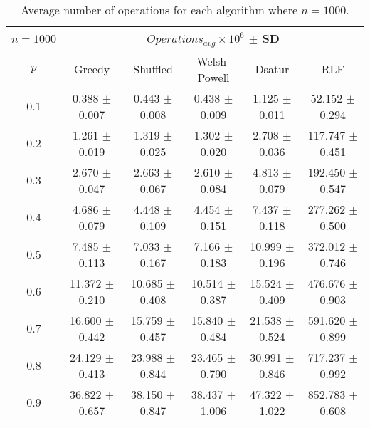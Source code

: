 \begin{table}[H]
    \centering
    \begin{tabular}{cccccc}
        
        $n = 1000$& \multicolumn{5}{c}{$Operations_{avg}\times10^6$ $\pm$ SD} \\
        \hline
        $p$ & Greedy & Shuffled & Welsh-Powell & Dsatur & RLF \\
        \hline
        0.1 & 0.388 $\pm$ 0.007 & 0.443 $\pm$ 0.008 & 0.438 $\pm$ 0.009 & 1.125 $\pm$ 0.011 & 52.152 $\pm$ 0.294 \\
        0.2 & 1.261 $\pm$ 0.019 & 1.319 $\pm$ 0.025 & 1.302 $\pm$ 0.020 & 2.708 $\pm$ 0.036 & 117.747 $\pm$ 0.451 \\
        0.3 & 2.670 $\pm$ 0.047 & 2.663 $\pm$ 0.067 & 2.610 $\pm$ 0.084 & 4.813 $\pm$ 0.079 & 192.450 $\pm$ 0.547 \\
        0.4 & 4.686 $\pm$ 0.079 & 4.448 $\pm$ 0.109 & 4.454 $\pm$ 0.151 & 7.437 $\pm$ 0.118 & 277.262 $\pm$ 0.500 \\
        0.5 & 7.485 $\pm$ 0.113 & 7.033 $\pm$ 0.167 & 7.166 $\pm$ 0.183 & 10.999 $\pm$ 0.196 & 372.012 $\pm$ 0.746 \\
        0.6 & 11.372 $\pm$ 0.210 & 10.685 $\pm$ 0.408 & 10.514 $\pm$ 0.387 & 15.524 $\pm$ 0.409 & 476.676 $\pm$ 0.903 \\
        0.7 & 16.600 $\pm$ 0.442 & 15.759 $\pm$ 0.457 & 15.840 $\pm$ 0.484 & 21.538 $\pm$ 0.524 & 591.620 $\pm$ 0.899 \\
        0.8 & 24.129 $\pm$ 0.413 & 23.988 $\pm$ 0.844 & 23.465 $\pm$ 0.790 & 30.991 $\pm$ 0.846 & 717.237 $\pm$ 0.992 \\
        0.9 & 36.822 $\pm$ 0.657 & 38.150 $\pm$ 0.847 & 38.437 $\pm$ 1.006 & 47.322 $\pm$ 1.022 & 852.783 $\pm$ 0.608 \\
        \hline
    \end{tabular}
    \caption{Average number of operations for each algorithm where $n = 1000$.}
    \label{tab:avgOpsforV1000}
\end{table}


